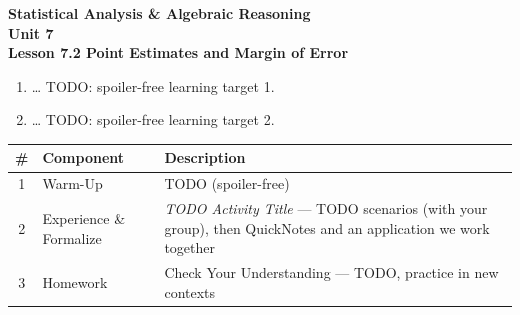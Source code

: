\documentclass[10pt]{article}
\begin{document}
\vspace{-0.8in}

\begin{center}
  {\color{white}\textbf{\LARGE Statistical Analysis \& Algebraic Reasoning}}\\[4pt]
  {\color{frostmid}\large\textbf{Unit 7}}\\[6pt]
  {\color{white}\textbf{\large Lesson 7.2 \quad Point Estimates and Margin of Error}}
\end{center}

\vspace{0.22in}
\namedateperiod
\vspace{0.18in}

\begin{learningtargetbox}
\small
\begin{enumerate}[leftmargin=1.5em, itemsep=5pt]
  \item \ldots{} TODO: spoiler-free learning target 1.
  \item \ldots{} TODO: spoiler-free learning target 2.
\end{enumerate}
\end{learningtargetbox}

\vspace{0.14in}

\begin{tocbox}
\small
\renewcommand{\arraystretch}{1.5}
\begin{tabularx}{\linewidth}{@{} c l X @{}}
\rowcolor{frost}
\textbf{\#} & \textbf{Component} & \textbf{Description} \\
\midrule
1 & Warm-Up    & TODO (spoiler-free) \\
2 & Experience \& Formalize & \emph{TODO Activity Title} --- TODO scenarios (with your group),
                 then QuickNotes and an application we work together \\
3 & Homework   & Check Your Understanding --- TODO, practice in new contexts \\
\end{tabularx}
\end{tocbox}
\end{document}
